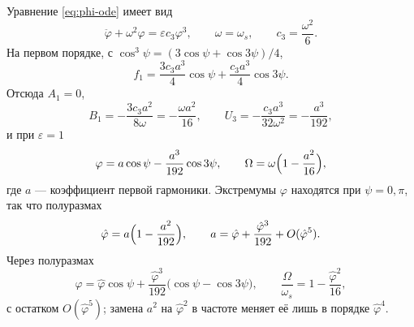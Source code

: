 Уравнение \eqref{eq:phi-ode} имеет вид
\begin{equation}
\label{eq:bm-c}
\ddot\varphi+\omega^2\varphi=\varepsilon c_3\varphi^3,
\qquad
\omega=\omega_s,
\qquad
c_3=\frac{\omega^2}{6}.
\end{equation}
На первом порядке, с $\cos^3\psi=(3\cos\psi+\cos3\psi)/4$,
\begin{equation}
\label{eq:f1c}
f_1
=\frac{3c_3 a^3}{4}\cos\psi
+\frac{c_3 a^3}{4}\cos 3\psi.
\end{equation}
Отсюда $A_1=0$,
\begin{equation}
\label{eq:B1U3}
B_1=-\frac{3c_3 a^2}{8\omega}=-\frac{\omega a^2}{16},
\qquad
U_3=-\frac{c_3 a^3}{32\omega^2}=-\frac{a^3}{192},
\end{equation}
и при $\varepsilon=1$
\begin{equation}
\label{eq:phi-a}
\varphi
=a\cos\psi-\frac{a^3}{192}\cos 3\psi,
\qquad
\Omega=\omega\Bigl(1-\frac{a^2}{16}\Bigr),
\end{equation}
где $a$ --- коэффициент первой гармоники. Экстремумы $\varphi$ находятся при $\psi=0,\pi$, так что полуразмах
\begin{equation}
\label{eq:phihat-a}
\hat\varphi=a\Bigl(1-\frac{a^2}{192}\Bigr),
\qquad
a=\hat\varphi+\frac{\hat\varphi^3}{192}+O(\hat\varphi^5).
\end{equation}
Через полуразмах
\begin{equation}
\label{eq:phi-hat-cos}
\varphi
=\hat\varphi\cos\psi
+\frac{\hat\varphi^3}{192}\bigl(\cos\psi-\cos 3\psi\bigr),
\qquad
\frac{\Omega}{\omega_s}=1-\frac{\hat\varphi^2}{16},
\end{equation}
с остатком $O(\hat\varphi^5)$; замена $a^2$ на $\hat\varphi^2$ в частоте меняет её лишь в порядке $\hat\varphi^4$.
